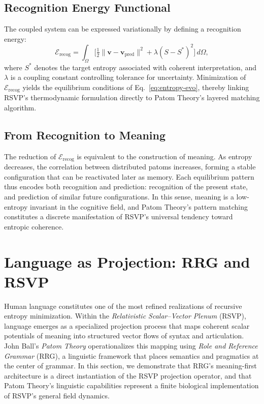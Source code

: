 \documentclass[11pt]{article}
\begin{document}
\subsection{Recognition Energy Functional}
The coupled system can be expressed variationally by defining a recognition energy:
\[
\mathcal{E}_{\mathrm{recog}}
  = \int_\Omega
    \big[
      \tfrac{1}{2}\|\mathbf{v}-\mathbf{v}_{\mathrm{pred}}\|^2
      + \lambda (S - S^\ast)^2
    \big]\, d\Omega,
\]
where $S^\ast$ denotes the target entropy associated with coherent interpretation, and $\lambda$ is a coupling constant controlling tolerance for uncertainty. Minimization of $\mathcal{E}_{\mathrm{recog}}$ yields the equilibrium conditions of Eq.~\eqref{eq:entropy-evo}, thereby linking RSVP’s thermodynamic formulation directly to Patom Theory’s layered matching algorithm.

\subsection{From Recognition to Meaning}
The reduction of $\mathcal{E}_{\mathrm{recog}}$ is equivalent to the construction of meaning. As entropy decreases, the correlation between distributed patoms increases, forming a stable configuration that can be reactivated later as memory. Each equilibrium pattern thus encodes both recognition and prediction: recognition of the present state, and prediction of similar future configurations. In this sense, meaning is a low-entropy invariant in the cognitive field, and Patom Theory’s pattern matching constitutes a discrete manifestation of RSVP’s universal tendency toward entropic coherence.

\section{Language as Projection: RRG and RSVP}
Human language constitutes one of the most refined realizations of recursive entropy minimization. Within the \textit{Relativistic Scalar--Vector Plenum} (RSVP), language emerges as a specialized projection process that maps coherent scalar potentials of meaning into structured vector flows of syntax and articulation. John Ball’s \textit{Patom Theory} operationalizes this mapping using \textit{Role and Reference Grammar} (RRG), a linguistic framework that places semantics and pragmatics at the center of grammar. In this section, we demonstrate that RRG’s meaning-first architecture is a direct instantiation of the RSVP projection operator, and that Patom Theory’s linguistic capabilities represent a finite biological implementation of RSVP’s general field dynamics.
\end{document}

